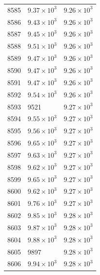 \begin{table}[H]
\begin{tabular}{lll}
8585 & $\displaystyle 9.37 \times 10^{3}$ & $\displaystyle 9.26 \times 10^{3}$ \\
8586 & $\displaystyle 9.43 \times 10^{3}$ & $\displaystyle 9.26 \times 10^{3}$ \\
8587 & $\displaystyle 9.45 \times 10^{3}$ & $\displaystyle 9.26 \times 10^{3}$ \\
8588 & $\displaystyle 9.51 \times 10^{3}$ & $\displaystyle 9.26 \times 10^{3}$ \\
8589 & $\displaystyle 9.47 \times 10^{3}$ & $\displaystyle 9.26 \times 10^{3}$ \\
8590 & $\displaystyle 9.47 \times 10^{3}$ & $\displaystyle 9.26 \times 10^{3}$ \\
8591 & $\displaystyle 9.47 \times 10^{3}$ & $\displaystyle 9.26 \times 10^{3}$ \\
8592 & $\displaystyle 9.54 \times 10^{3}$ & $\displaystyle 9.26 \times 10^{3}$ \\
8593 & 9521 & $\displaystyle 9.27 \times 10^{3}$ \\
8594 & $\displaystyle 9.55 \times 10^{3}$ & $\displaystyle 9.27 \times 10^{3}$ \\
8595 & $\displaystyle 9.56 \times 10^{3}$ & $\displaystyle 9.27 \times 10^{3}$ \\
8596 & $\displaystyle 9.65 \times 10^{3}$ & $\displaystyle 9.27 \times 10^{3}$ \\
8597 & $\displaystyle 9.63 \times 10^{3}$ & $\displaystyle 9.27 \times 10^{3}$ \\
8598 & $\displaystyle 9.62 \times 10^{3}$ & $\displaystyle 9.27 \times 10^{3}$ \\
8599 & $\displaystyle 9.65 \times 10^{3}$ & $\displaystyle 9.27 \times 10^{3}$ \\
8600 & $\displaystyle 9.62 \times 10^{3}$ & $\displaystyle 9.27 \times 10^{3}$ \\
8601 & $\displaystyle 9.76 \times 10^{3}$ & $\displaystyle 9.27 \times 10^{3}$ \\
8602 & $\displaystyle 9.85 \times 10^{3}$ & $\displaystyle 9.28 \times 10^{3}$ \\
8603 & $\displaystyle 9.87 \times 10^{3}$ & $\displaystyle 9.28 \times 10^{3}$ \\
8604 & $\displaystyle 9.88 \times 10^{3}$ & $\displaystyle 9.28 \times 10^{3}$ \\
8605 & 9897 & $\displaystyle 9.28 \times 10^{3}$ \\
8606 & $\displaystyle 9.94 \times 10^{3}$ & $\displaystyle 9.28 \times 10^{3}$ \\

\end{tabular}
\end{table}

